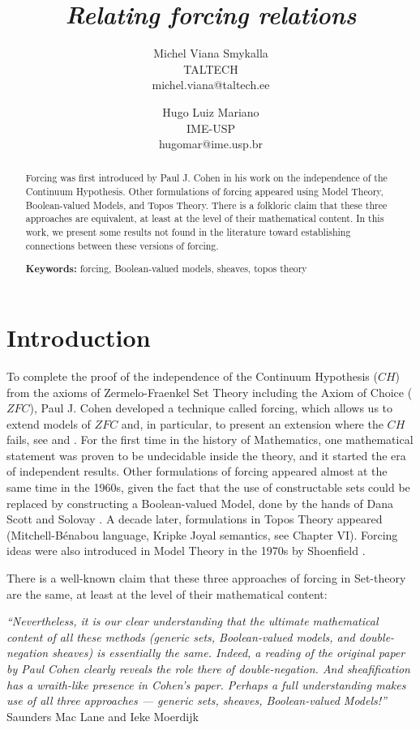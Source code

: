 \documentclass[10pt,longbibliography]{article}
\title{\emph{Relating forcing relations}}
\author{Michel Viana Smykalla \\ { \small TALTECH} \\
{\small michel.viana@taltech.ee} \and Hugo Luiz Mariano \\ {\small IME-USP} \\ {\small hugomar@ime.usp.br}}
\date{}
\begin{document}
\maketitle
\doublespacing
\begin{abstract}
Forcing was first introduced by Paul J. Cohen in his work on the independence of the Continuum Hypothesis. Other formulations of forcing appeared using Model Theory, Boolean-valued Models, and Topos Theory. There is a folkloric claim that these three approaches are equivalent, at least at the level of their mathematical content. In this work, we present some results not found in the literature toward establishing connections between these versions of forcing.

{\bf Keywords:} forcing, Boolean-valued models, sheaves, topos theory
\end{abstract}

\section*{Introduction}


To complete the proof of the independence of the Continuum Hypothesis ($CH$) from the axioms of Zermelo-Fraenkel Set Theory including the Axiom of Choice ($ZFC$), Paul J. Cohen developed a technique called forcing, which allows us to extend models of $ZFC$ and, in particular, to present an extension where the $CH$ fails, see \cite{Cohen63} and \cite{Cohen64}. For the first time in the history of Mathematics, one mathematical statement was proven to be undecidable inside the theory, and it started the era of independent results. Other formulations of forcing appeared almost at the same time in the 1960s, given the fact that the use of constructable sets could be replaced by constructing a Boolean-valued Model, done by the hands of Dana Scott and Solovay \cite{Scott67}. A decade later, formulations in Topos Theory appeared (Mitchell-Bénabou language, Kripke Joyal semantics, see \cite{MacMoe94} Chapter VI). Forcing ideas were also introduced in Model Theory in the 1970s by Shoenfield \cite{Shoen71}.


There is a well-known claim that these three approaches of forcing in Set-theory  are the same, at least at the level of their mathematical content:

\begin{center}
\emph{``Nevertheless, it is our clear understanding that the ultimate mathematical content of all these methods (generic sets, Boolean-valued models, and double-negation sheaves) is essentially the same. Indeed, a reading of the original paper by Paul Cohen clearly reveals the role there of double-negation. And sheafification has a wraith-like presence in Cohen's paper. 
Perhaps a full understanding makes use of all three approaches --- generic sets, sheaves, Boolean-valued Models!''} \\ Saunders Mac Lane and
Ieke Moerdijk \cite{MacMoe94}
    
\end{center}
\end{document}
